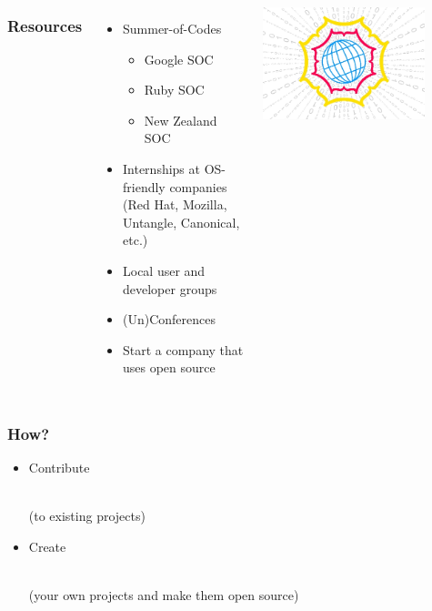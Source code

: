 \documentclass{beamer}
\begin{document}
\begin{frame}
  \begin{columns}[c]
    \frametitle{Resources}
    \begin{itemize}
    \item Summer-of-Codes
      \begin{itemize}
      \item Google SOC
      \item Ruby SOC
      \item New Zealand SOC
      \end{itemize}
    \item Internships at OS-friendly companies \\ (Red Hat, Mozilla,
      Untangle, Canonical, etc.)
    \item Local user and developer groups
    \item (Un)Conferences
    \item Start a company that uses open source
    \end{itemize}
    \includegraphics[width=0.8\textwidth]{../img/soc}
  \end{columns}

\end{frame}

\begin{frame}
  \frametitle{How?}
  \begin{itemize}
    \setlength{\itemsep}{2em}
  \item \begin{LARGE} \textcolor{beamer@mygrey}{Contribute} \end{LARGE} \\ \textcolor{beamer@mygrey}{(to existing projects)}
  \item \begin{LARGE} \textcolor{beamer@myblue}{Create} \end{LARGE} \\ \textcolor{beamer@myblue}{(your own projects and make them open source)}
  \end{itemize}
\end{frame}
\end{document}
